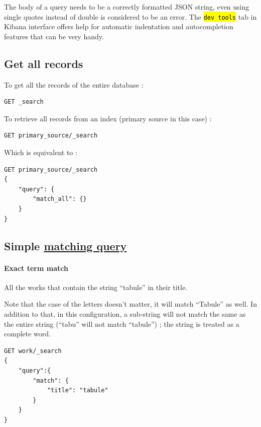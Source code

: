 \documentclass[a4paper,12pt,twoside]{book}
\let\OldTexttt\texttt
\renewcommand{\texttt}[1]{\OldTexttt{\hl{#1}}}
\let\quoteOld\quote
\let\endquoteOld\endquote
\renewenvironment{quote}{\small\quoteOld}{\endquoteOld}
\begin{document}
The body of a query needs to be a correctly formatted JSON string, even using single quotes instead of double is considered to be an error. The \texttt{dev tools} tab in Kibana interface offers help for automatic indentation and autocompletion features that can be very handy.

		\subsection{Get all records}\label{get-all-records}

To get all the records of the entire database :

\begin{lstlisting}
GET _search
\end{lstlisting}

To retrieve all records from an index (primary source in this case) :

\begin{lstlisting}
GET primary_source/_search
\end{lstlisting}

Which is equivalent to :

\begin{lstlisting}
GET primary_source/_search
{
    "query": {
        "match_all": {}
    }
}
\end{lstlisting}

		\subsection{Simple \href{https://www.elastic.co/guide/en/elasticsearch/reference/current/query-dsl-match-query.html}{matching query}}\label{simple-matching-query}

				\paragraph{Exact term match}\label{exact-term-match}

\begin{quote}
	All the works that contain the string ``tabule'' in their title.
\end{quote}

Note that the case of the letters doesn't matter, it will match ``Tabule'' as well. In addition to that, in this configuration, a sub-string will not match the same as the entire string (``tabu'' will not match ``tabule'') ; the string is treated as a complete word.

\begin{lstlisting}
GET work/_search
{
    "query":{
        "match": {
            "title": "tabule"
        }
    }
}
\end{lstlisting}
\end{document}

